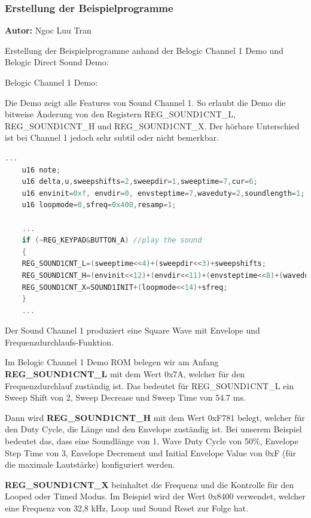 \documentclass[11pt,a4paper]{scrartcl}
\newcommand{\AutorNgoc} {
    \vspace{-4mm}
    \large \textbf{Autor:} Ngoc Luu Tran \normalsize
    \vspace{2mm}
}
\begin{document}
\subsubsection{Erstellung der Beispielprogramme}
\AutorNgoc

Erstellung der Beispielprogramme anhand der Belogic Channel 1 Demo und Belogic Direct Sound Demo:

Belogic Channel 1 Demo:

Die Demo zeigt alle Features von Sound Channel 1. So erlaubt die Demo die bitweise \"Anderung von den Registern REG\_SOUND1CNT\_L, REG\_SOUND1CNT\_H und REG\_SOUND1CNT\_X. Der h\"orbare Unterschied ist bei Channel 1 jedoch sehr subtil oder nicht bemerkbar.\newline

\begin{lstlisting}[language=C++, caption={Belogic Channel 1 Demo}, label={list:channel1}]
	...
	u16 note;
	u16 delta,u,sweepshifts=2,sweepdir=1,sweeptime=7,cur=6;
	u16 envinit=0xf, envdir=0, envsteptime=7,waveduty=2,soundlength=1;
	u16 loopmode=0,sfreq=0x400,resamp=1;

    ...
	if (~REG_KEYPAD&BUTTON_A) //play the sound
	{ 
	REG_SOUND1CNT_L=(sweeptime<<4)+(sweepdir<<3)+sweepshifts;
	REG_SOUND1CNT_H=(envinit<<12)+(envdir<<11)+(envsteptime<<8)+(waveduty<<6)+soundlength;
	REG_SOUND1CNT_X=SOUND1INIT+(loopmode<<14)+sfreq;
	}
	...
\end{lstlisting}

Der Sound Channel 1 produziert eine Square Wave mit Envelope und Frequenzdurchlaufs-Funktion. 

Im Belogic Channel 1 Demo ROM belegen wir am Anfang \textbf{REG\_SOUND1CNT\_L} mit dem Wert 0x7A, welcher f\"ur den Frequenzdurchlauf zust\"andig ist. Das bedeutet f\"ur REG\_SOUND1CNT\_L ein Sweep Shift von 2, Sweep Decrease und Sweep Time von 54.7 ms.

Dann wird \textbf{REG\_SOUND1CNT\_H} mit dem Wert 0xF781 belegt, welcher f\"ur den Duty Cycle, die L\"ange und den Envelope zust\"andig ist. Bei unserem Beispiel bedeutet das, dass eine Soundl\"ange von 1, Wave Duty Cycle von 50\%, Envelope Step Time von 3, Envelope Decrement und Initial Envelope Value von 0xF (f\"ur die maximale Lautst\"arke) konfiguriert werden.

\textbf{REG\_SOUND1CNT\_X} beinhaltet die Frequenz und die Kontrolle f\"ur den Looped oder Timed Modus. Im Beispiel wird der Wert 0x8400 verwendet, welcher eine Frequenz von 32,8 kHz, Loop und Sound Reset zur Folge hat.
\end{document}
